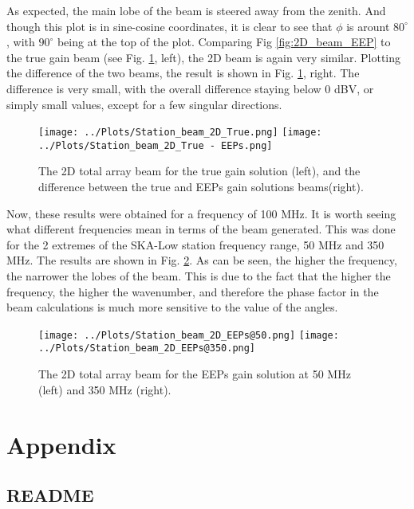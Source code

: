 \documentclass[12pt]{report} %
\begin{document}
As expected, the main lobe of the beam is steered away from the zenith. And though this plot is in sine-cosine coordinates, it is clear to see that $\phi$ is arount $80^{\circ}$, with $90^{\circ}$ being at the top of the plot. Comparing Fig \ref{fig:2D_beam_EEP} to the true gain beam (see Fig. \ref{fig:2D_beam_true_diff}, left), the 2D beam is again very similar. Plotting the difference of the two beams, the result is shown in Fig. \ref{fig:2D_beam_true_diff}, right. The difference is very small, with the overall difference staying below $0$ dBV, or simply small values, except for a few singular directions.

\begin{figure}[h]
    \centering
    \texttt{[image: ../Plots/Station\_beam\_2D\_True.png]}
    \texttt{[image: ../Plots/Station\_beam\_2D\_True - EEPs.png]}
    \caption{The 2D total array beam for the true gain solution (left), and the difference between the true and EEPs gain solutions beams(right).}
    \label{fig:2D_beam_true_diff}
\end{figure}

Now, these results were obtained for a frequency of 100 MHz. It is worth seeing what different frequencies mean in terms of the beam generated. This was done for the 2 extremes of the SKA-Low station frequency range, 50 MHz and 350 MHz. The results are shown in Fig. \ref{fig:2D_beam_freqs}. As can be seen, the higher the frequency, the narrower the lobes of the beam. This is due to the fact that the higher the frequency, the higher the wavenumber, and therefore the phase factor in the beam calculations is much more sensitive to the value of the angles.

\begin{figure}[h]
    \centering
    \texttt{[image: ../Plots/Station\_beam\_2D\_EEPs@50.png]}
    \texttt{[image: ../Plots/Station\_beam\_2D\_EEPs@350.png]}
    \caption{The 2D total array beam for the EEPs gain solution at 50 MHz (left) and 350 MHz (right).}
    \label{fig:2D_beam_freqs}
\end{figure}


\chapter{Appendix}

\section{README}
\end{document}
